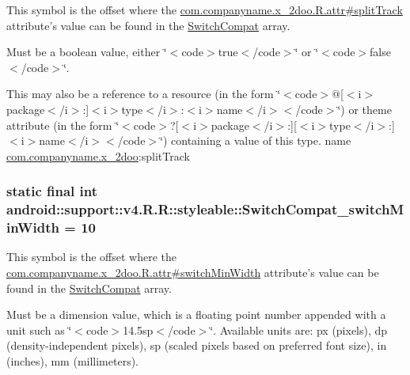 This symbol is the offset where the \hyperlink{classcom_1_1companyname_1_1x__2doo_1_1_r_1_1attr_f127297c68f0c2b75d807ff3c5c3ceba}{com.companyname.x\_\-2doo.R.attr\#splitTrack} attribute's value can be found in the \hyperlink{classandroid_1_1support_1_1v4_1_1_r_1_1styleable_276d9c1ec80821a3e0fcdaa41daa75a0}{SwitchCompat} array.

Must be a boolean value, either \char`\"{}$<$code$>$true$<$/code$>$\char`\"{} or \char`\"{}$<$code$>$false$<$/code$>$\char`\"{}. 

This may also be a reference to a resource (in the form \char`\"{}$<$code$>$@\mbox{[}$<$i$>$package$<$/i$>$:\mbox{]}$<$i$>$type$<$/i$>$:$<$i$>$name$<$/i$>$$<$/code$>$\char`\"{}) or theme attribute (in the form \char`\"{}$<$code$>$?\mbox{[}$<$i$>$package$<$/i$>$:\mbox{]}\mbox{[}$<$i$>$type$<$/i$>$:\mbox{]}$<$i$>$name$<$/i$>$$<$/code$>$\char`\"{}) containing a value of this type.  name \hyperlink{namespacecom_1_1companyname_1_1x__2doo}{com.companyname.x\_\-2doo}:splitTrack \hypertarget{classandroid_1_1support_1_1v4_1_1_r_1_1styleable_98a2bf49a68fe279d68595eef6c847a2}{
\subsubsection[{SwitchCompat\_\-switchMinWidth}]{\setlength{\rightskip}{0pt plus 5cm}static final int android::support::v4.R.R::styleable::SwitchCompat\_\-switchMinWidth = 10}}
\label{classandroid_1_1support_1_1v4_1_1_r_1_1styleable_98a2bf49a68fe279d68595eef6c847a2}


This symbol is the offset where the \hyperlink{classcom_1_1companyname_1_1x__2doo_1_1_r_1_1attr_b03b9debfb09d95296202adad4c927fc}{com.companyname.x\_\-2doo.R.attr\#switchMinWidth} attribute's value can be found in the \hyperlink{classandroid_1_1support_1_1v4_1_1_r_1_1styleable_276d9c1ec80821a3e0fcdaa41daa75a0}{SwitchCompat} array.

Must be a dimension value, which is a floating point number appended with a unit such as \char`\"{}$<$code$>$14.5sp$<$/code$>$\char`\"{}. Available units are: px (pixels), dp (density-independent pixels), sp (scaled pixels based on preferred font size), in (inches), mm (millimeters). 

